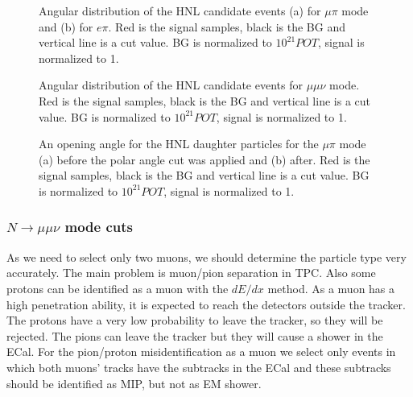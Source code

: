 \documentclass[../main.tex]{subfiles}
\begin{document}
\begin{figure}[!ht]
  \begin{minipage}[h]{0.49\linewidth}
  \end{minipage}
  \hfill
  \begin{minipage}[h]{0.49\linewidth}
  \end{minipage}
  \caption{Angular distribution of the HNL candidate events (a) for $\mu\pi$ mode and (b) for $e\pi$. Red is the signal samples, black is the BG and vertical line is a cut value. BG is normalized to $10^{21}POT$, signal is normalized to 1.}
  \label{fig:HNL:kin1}
\end{figure}

\begin{figure}[!ht]
  \caption{Angular distribution of the HNL candidate events for $\mu\mu\nu$ mode. Red is the signal samples, black is the BG and vertical line is a cut value. BG is normalized to $10^{21}POT$, signal is normalized to 1.}
  \label{fig:HNL:kin2}
\end{figure}

\begin{figure}[!ht]
  \begin{minipage}[h]{0.49\linewidth}
  \end{minipage}
  \hfill
  \begin{minipage}[h]{0.49\linewidth}
  \end{minipage}
  \caption{An opening angle for the HNL daughter particles for the $\mu\pi$ mode (a) before the polar angle cut was applied and (b) after. Red is the signal samples, black is the BG and vertical line is a cut value. BG is normalized to $10^{21}POT$, signal is normalized to 1.}
  \label{fig:HNL:kin3}
\end{figure}

\subsubsection{\texorpdfstring{$N\to\mu\mu\nu$}{Lg}  mode cuts}
As we need to select only two muons, we should determine the particle type very accurately. The main problem is muon/pion separation in TPC. Also some protons can be identified as a muon with the $dE/dx$ method. As a muon has a high penetration ability, it is expected to reach the detectors outside the tracker. The protons have a very low probability to leave the tracker, so they will be rejected. The pions can leave the tracker but they will cause a shower in the ECal. For the pion/proton misidentification as a muon we select only events in which both muons' tracks have the subtracks in the ECal and these subtracks should be identified as MIP, but not as EM shower.
\end{document}
